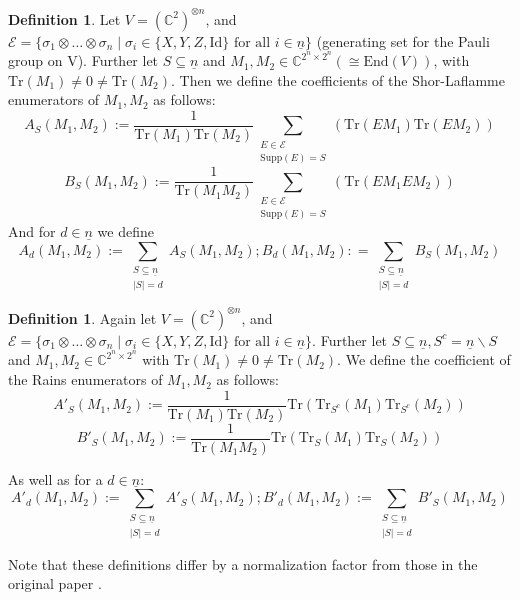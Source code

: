 \documentclass{article}
\def\C{\mathbb{C}}
\def\supp{\text{Supp}}
\def\n{\underline{n}}
\def\fa{\text{ for all }}
\def\Tr{\text{Tr}}
\def\Id{\text{Id}}
\theoremstyle{definition}
\newtheorem{defn}[Satz]{Definition}
\begin{document}
\begin{defn}\label{shorLaflamme}
Let $V = (\C^2)^{\otimes n}$, and $\mathcal{E} = \{ \sigma_1 \otimes \ldots \otimes \sigma_n \mid \sigma_i \in \{X,Y,Z,\Id \} \fa i \in \underline{n} \}$ (generating set for the Pauli group on V). Further let $S \subseteq \underline{n}$ and $M_1, M_2 \in \C^{2^n \times 2^n} (\cong \text{End}(V))$, with $\Tr(M_1) \neq 0 \neq \Tr(M_2)$.
Then we define the coefficients of the Shor-Laflamme enumerators \cite{shor-Laflamme} of $M_1, M_2$ as follows:
\begin{equation} A_S(M_1,M_2) := \frac{1}{\Tr(M_1)\Tr(M_2)}\sum_{\substack{E \in \mathcal{E} \\ \supp(E) = S}}(\Tr(E M_1)\Tr(E M_2)) \end{equation}
\begin{equation} B_S(M_1,M_2) := \frac{1}{\Tr(M_1 M_2)} \sum_{\substack{E \in \mathcal{E} \\ \supp(E) = S}}(\Tr(E M_1 E M_2)) \end{equation}
And for $d \in \underline{n}$ we define
\begin{equation} A_d(M_1,M_2) := \sum_{\substack{ S \subseteq \underline{n} \\ |S| = d}} A_S(M_1,M_2) ; B_d(M_1,M_2): = \sum_{\substack{ S \subseteq \underline{n} \\ |S| = d}} B_S(M_1,M_2) \end{equation}
\end{defn}


\begin{defn}\label{rains}
Again let $V = (\C^2)^{\otimes n}$, and $\mathcal{E} = \{ \sigma_1 \otimes \ldots \otimes \sigma_n \mid \sigma_i \in \{X,Y,Z,\Id \} \fa i \in \underline{n} \}$. Further let $S \subseteq \underline{n}, S^c = \n \backslash S$ and $M_1, M_2 \in \C^{2^n \times 2^n}$ with $\Tr(M_1) \neq 0 \neq \Tr(M_2)$.
We define the coefficient of the Rains enumerators \cite{rains} of $M_1,M_2$ as follows:
\begin{equation}A'_S(M_1,M_2) := \frac{1}{\Tr(M_1)\Tr(M_2)} \Tr(\Tr_{S^c}(M_1)\Tr_{S^c}(M_2)) \end{equation}
\begin{equation}B'_S(M_1,M_2) := \frac{1}{\Tr(M_1 M_2)} \Tr(\Tr_S(M_1)\Tr_S(M_2)) \end{equation}

As well as for a $d \in \n$: 
\begin{equation} A'_d(M_1,M_2) := \sum_{\substack{ S \subseteq \underline{n} \\ |S| = d}} A'_S(M_1,M_2) ; B'_d(M_1,M_2) := \sum_{\substack{ S \subseteq \underline{n} \\ |S| = d}} B'_S(M_1,M_2) \end{equation}
\end{defn}
Note that these definitions differ by a normalization factor from those in the original paper \cite{rains}.
\end{document}
